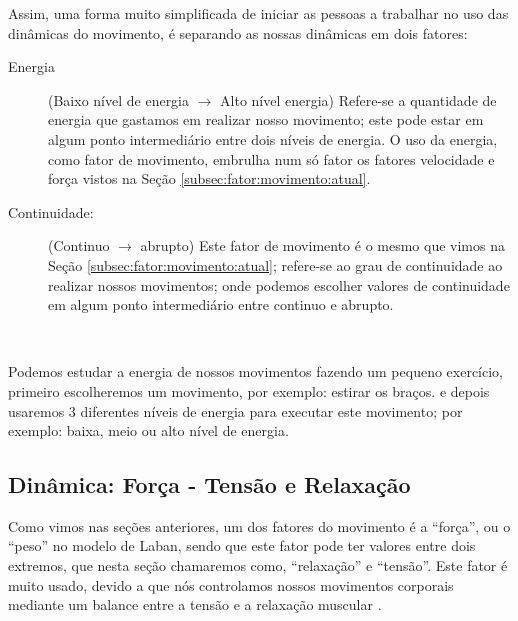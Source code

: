 Assim, 
uma forma muito simplificada de iniciar as pessoas a trabalhar no uso das dinâmicas do movimento,
é separando as nossas dinâmicas em dois fatores:
\begin{description}
\item[Energia] (Baixo nível de energia $\rightarrow$ Alto nível energia)
Refere-se a quantidade de energia que gastamos em realizar nosso movimento;
este pode estar em algum ponto intermediário entre dois níveis de energia. 
O uso da energia, como fator de movimento, embrulha num só fator os 
fatores velocidade e força vistos na Seção  \ref{subsec:fator:movimento:atual}.
\item[Continuidade:] (Continuo $\rightarrow$ abrupto)
Este fator de movimento é o mesmo que vimos na Seção \ref{subsec:fator:movimento:atual};
refere-se ao grau de continuidade ao realizar nossos movimentos;
onde podemos escolher valores de continuidade em algum ponto intermediário entre continuo e abrupto.
\end{description}~

\begin{example}
Podemos estudar a energia de nossos movimentos fazendo um pequeno exercício,
primeiro escolheremos um movimento, por exemplo: estirar os braços.
e depois usaremos 3 diferentes níveis de energia para executar este movimento;
por exemplo: baixa, meio ou alto nível de energia.
\end{example}

\subsection{Dinâmica: Força - Tensão e Relaxação }
\label{sec:musicalidadetensionrelease}



Como vimos nas seções anteriores,
um dos fatores do movimento é a ``força'', 
ou o ``peso'' no modelo de Laban,
sendo que este fator pode ter valores entre dois extremos,
que nesta seção chamaremos como, ``relaxação'' e ``tensão''.
Este fator é muito usado, 
devido a que nós controlamos nossos movimentos corporais 
mediante um balance entre a tensão e a relaxação muscular \cite[pp. 7]{schrader2005sense}.

